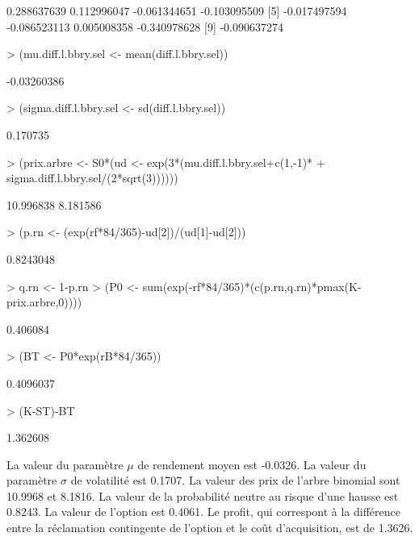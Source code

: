 \begin{solution}{1.3}

\begin{Schunk}
\begin{Soutput}
[1]  0.288637639  0.112996047 -0.061344651 -0.103095509
[5] -0.017497594 -0.086523113  0.005008358 -0.340978628
[9] -0.090637274
\end{Soutput}
\begin{Sinput}
> (mu.diff.l.bbry.sel <- mean(diff.l.bbry.sel))
\end{Sinput}
\begin{Soutput}
[1] -0.03260386
\end{Soutput}
\begin{Sinput}
> (sigma.diff.l.bbry.sel <- sd(diff.l.bbry.sel))
\end{Sinput}
\begin{Soutput}
[1] 0.170735
\end{Soutput}
\begin{Sinput}
> (prix.arbre <- S0*(ud <- exp(3*(mu.diff.l.bbry.sel+c(1,-1)*
+                                   sigma.diff.l.bbry.sel/(2*sqrt(3))))))
\end{Sinput}
\begin{Soutput}
[1] 10.996838  8.181586
\end{Soutput}
\begin{Sinput}
> (p.rn <- (exp(rf*84/365)-ud[2])/(ud[1]-ud[2]))
\end{Sinput}
\begin{Soutput}
[1] 0.8243048
\end{Soutput}
\begin{Sinput}
> q.rn <- 1-p.rn
> (P0 <- sum(exp(-rf*84/365)*(c(p.rn,q.rn)*pmax(K-prix.arbre,0))))
\end{Sinput}
\begin{Soutput}
[1] 0.406084
\end{Soutput}
\begin{Sinput}
> (BT <- P0*exp(rB*84/365))
\end{Sinput}
\begin{Soutput}
[1] 0.4096037
\end{Soutput}
\begin{Sinput}
> (K-ST)-BT
\end{Sinput}
\begin{Soutput}
[1] 1.362608
\end{Soutput}
\end{Schunk}
La valeur du paramètre $\mu$ de rendement moyen est -0.0326.
La valeur du paramètre $\sigma$ de volatilité est 0.1707.
La valeur des prix de l'arbre binomial sont 10.9968 et 8.1816.
La valeur de la probabilité neutre au risque d'une hausse est 0.8243.
La valeur de l'option est 0.4061.
Le profit, qui correspont à la différence entre la réclamation contingente de l'option et le coût d'acquisition, est de 1.3626.
\end{solution}

